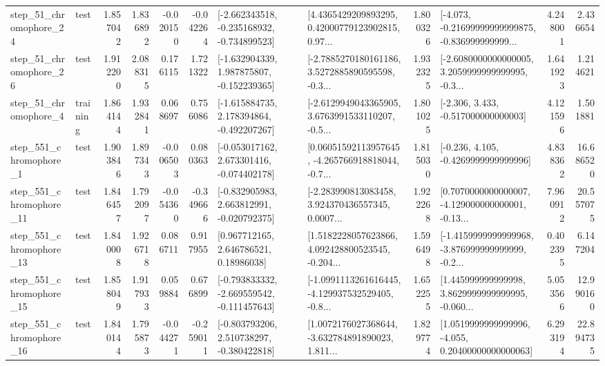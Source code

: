 \begin{tabular}{llrrrrllrlrr}
   step\_51\_chromophore\_24 &      test &      1.857042 &    1.836892 &     -0.020150 & -0.042264 &  [-2.662343518, -0.235168932, -0.734899523] &  [4.4365429209893295, 0.42000779123902815, 0.97... &       1.800326 &  [-4.073, -0.21699999999999875, -0.836999999999... &            4.248001 &          2.436654 \\
   step\_51\_chromophore\_26 &      test &      1.912200 &    2.088315 &      0.176115 &  1.721322 &   [-1.632904339, 1.987875807, -0.152239365] &  [-2.7885270180161186, 3.5272885890595598, -0.3... &       1.932325 &  [-2.6080000000000005, 3.2059999999999995, -0.3... &            1.641923 &          1.214621 \\
    step\_51\_chromophore\_4 &  training &      1.864144 &    1.932841 &      0.068697 &  0.756086 &   [-1.615884735, 2.178394864, -0.492207267] &  [-2.6129949043365905, 3.6763991533110207, -0.5... &       1.801025 &                [-2.306, 3.433, -0.517000000000003] &            4.121596 &          1.501881 \\
   step\_551\_chromophore\_1 &      test &      1.903846 &    1.897343 &     -0.006503 &  0.080363 &   [-0.053017162, 2.673301416, -0.074402178] &  [0.06051592113957645, -4.265766918818044, -0.7... &       1.815030 &               [-0.236, 4.105, -0.4269999999999996] &            4.838362 &         16.686520 \\
  step\_551\_chromophore\_11 &      test &      1.846457 &    1.792097 &     -0.054360 & -0.349666 &   [-0.832905983, 2.663812991, -0.020792375] &  [-2.283990813083458, 3.924370436557345, 0.0007... &       1.922268 &  [0.7070000000000007, -4.129000000000001, -0.13... &            7.960912 &         20.557075 \\
  step\_551\_chromophore\_13 &      test &      1.840008 &    1.926718 &      0.086711 &  0.917955 &      [0.967712165, 2.646786521, 0.18986038] &  [1.5182228057623866, 4.092428800523545, -0.204... &       1.596498 &  [-1.4159999999999968, -3.876999999999999, -0.2... &            0.402395 &          6.147204 \\
  step\_551\_chromophore\_15 &      test &      1.858049 &    1.917933 &      0.059884 &  0.676899 &  [-0.793833332, -2.669559542, -0.111457643] &  [-1.0991113261616445, -4.129937532529405, -0.8... &       1.652255 &  [1.445999999999998, 3.8629999999999995, -0.060... &            5.053566 &         12.990160 \\
  step\_551\_chromophore\_16 &      test &      1.840144 &    1.795873 &     -0.044271 & -0.259011 &   [-0.803793206, 2.510738297, -0.380422818] &  [1.0072176027368644, -3.632784891890023, 1.811... &       1.829774 &  [1.0519999999999996, -4.055, 0.20400000000000063] &            6.293194 &         22.894735 \\

\end{tabular}
